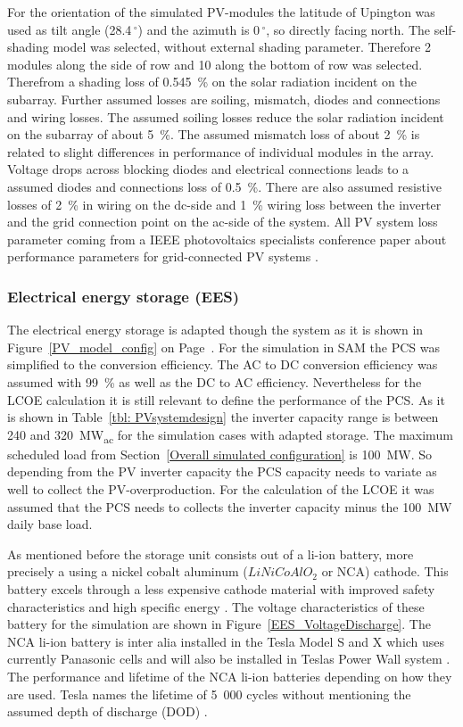 For the orientation of the simulated PV-modules the latitude of Upington was used as tilt angle (28.4$\,^{\circ}$) and the azimuth is 0$\,^{\circ}$, so directly facing north. The self-shading model was selected, without external shading parameter. Therefore 2 modules along the side of row and 10 along the bottom of row was selected. Therefrom a shading loss of 0.545~\% on the solar radiation incident on the subarray. Further assumed losses are soiling, mismatch, diodes and connections and wiring losses. The assumed soiling losses reduce the solar radiation incident on the subarray of about 5~\%. The assumed mismatch loss of about 2~\% is related to slight differences in performance of individual modules in the array. Voltage drops across blocking diodes and electrical connections leads to a assumed diodes and connections loss of 0.5~\%. There are also assumed resistive losses of 2~\% in wiring on the dc-side and 1~\% wiring loss between the inverter and the grid connection point on the ac-side of the system. All PV system loss parameter coming from a IEEE photovoltaics specialists conference paper about performance parameters for grid-connected PV systems \cite{Marion2005}.
\subsubsection{Electrical energy storage (EES)}
The electrical energy storage is adapted though the system as it is shown in Figure~\ref{PV_model_config} on Page~\pageref{PV_model_config}. For the simulation in SAM the PCS was simplified to the conversion efficiency. The AC to DC conversion efficiency was assumed with 99~\% as well as the DC to AC efficiency. Nevertheless for the LCOE calculation it is still relevant to define the performance of the PCS. As it is shown in Table~\ref{tbl: PVsystemdesign} the inverter capacity range is between 240 and \SI{320}{MW}\textsubscript{ac} for the simulation cases with adapted storage. The maximum scheduled load from Section~\ref{Overall simulated configuration} is \SI{100}{MW}. So depending from the PV inverter capacity the PCS capacity needs to variate as well to collect the  PV-overproduction. For the calculation of the LCOE it was assumed that the PCS needs to collects the inverter capacity minus the \SI{100}{MW} daily base load.



As mentioned before the storage unit consists out of a li-ion battery, more precisely a using a nickel cobalt aluminum ($LiNiCoAlO_2$  or NCA) cathode. This battery excels through a less expensive cathode material with improved safety characteristics and high specific energy \cite{NREL2015a}. The voltage characteristics of these battery for the simulation are shown in Figure~\ref{EES_VoltageDischarge}. The NCA li-ion battery is inter alia installed in the Tesla Model S and X \cite{Nykvist2015} which uses currently Panasonic cells and will also be installed in Teslas Power Wall system \cite{Shahan2015}. The performance and lifetime of the NCA li-ion batteries depending on how they are used. Tesla names the lifetime of 5~000 cycles without mentioning the assumed depth of discharge (DOD) \cite{Shahan2015}.

